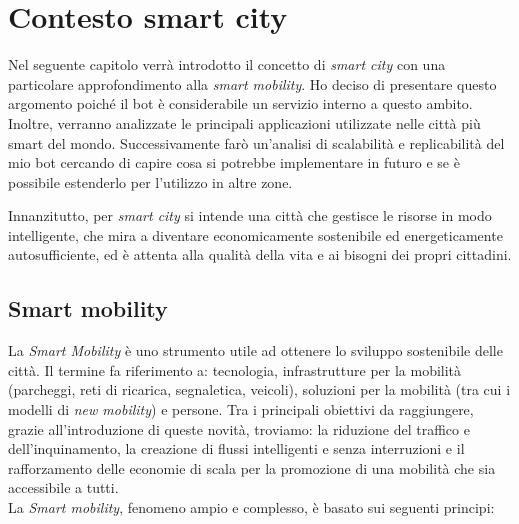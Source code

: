 \chapter{Contesto smart city}
\label{cha:smartcity}

Nel seguente capitolo verrà introdotto il concetto di \textit{smart city} con una particolare approfondimento alla \textit{smart mobility}. Ho deciso di presentare questo argomento poiché il bot è considerabile un servizio interno a questo ambito. Inoltre, verranno analizzate le principali applicazioni utilizzate nelle città più smart del mondo. Successivamente farò un'analisi di scalabilità e replicabilità del mio bot cercando di capire cosa si potrebbe implementare in futuro e se è possibile estenderlo per l'utilizzo in altre zone.

Innanzitutto, per \textit{smart city} si intende una città che gestisce le risorse in modo intelligente, che mira a diventare economicamente sostenibile ed energeticamente autosufficiente, ed è attenta alla qualità della vita e ai bisogni dei propri cittadini\cite{SmarCity}.

\section{Smart mobility}
\label{sec:smart-mobility}

La \textit{Smart Mobility} è uno strumento utile ad ottenere lo sviluppo sostenibile delle città. Il termine fa riferimento a: tecnologia, infrastrutture per la mobilità (parcheggi, reti di ricarica, segnaletica, veicoli), soluzioni per la mobilità (tra cui i modelli di \textit{new mobility}) e persone. Tra i principali obiettivi da raggiungere, grazie all'introduzione di queste novità, troviamo: la riduzione del traffico e dell'inquinamento, la creazione di flussi intelligenti e senza interruzioni e il rafforzamento delle economie di scala per la promozione di una mobilità che sia accessibile a tutti. \cite{SmartMobility}\\

\noindent La\textit{ Smart mobility}, fenomeno ampio e complesso, è basato sui seguenti principi:

